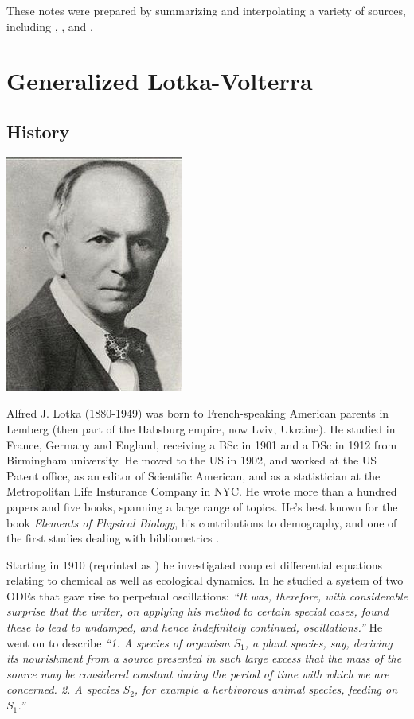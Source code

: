 \documentclass[]{book}
\begin{document}
These notes were prepared by summarizing and interpolating a variety of sources, including \citet{hadeler2017topics}, \citet{hofbauer1998evolutionary}, and \citet{baigent2016lotka}.

\hypertarget{intro}{%
\chapter{Generalized Lotka-Volterra}\label{intro}}

\hypertarget{history}{%
\section{History}\label{history}}

\begin{center}\includegraphics[width=0.25\linewidth]{images/Lotka} \end{center}

Alfred J. Lotka (1880-1949) was born to French-speaking American parents in Lemberg (then part of the Habsburg empire, now Lviv, Ukraine). He studied in France, Germany and England, receiving a BSc in 1901 and a DSc in 1912 from Birmingham university. He moved to the US in 1902, and worked at the US Patent office, as an editor of Scientific American, and as a statistician at the Metropolitan Life Insturance Company in NYC. He wrote more than a hundred papers and five books, spanning a large range of topics. He's best known for the book \emph{Elements of Physical Biology}, his contributions to demography, and one of the first studies dealing with bibliometrics \citep{lotka1926frequency}.

Starting in 1910 (reprinted as \citet{lotka2002contribution}) he investigated coupled differential equations relating to chemical as well as ecological dynamics. In \citet{lotka1920analytical} he studied a system of two ODEs that gave rise to perpetual oscillations: \emph{``It was, therefore, with considerable surprise that the writer, on applying his method to certain special cases, found these to lead to undamped, and hence indefinitely continued, oscillations.''} He went on to describe \emph{``1. A species of organism \(S_1\), a plant species, say, deriving its nourishment from a source presented in such large excess that the mass of the source may be considered constant during the period of time with which we are concerned. 2. A species \(S_2\), for example a herbivorous animal species, feeding on \(S_1\).''}
\end{document}
